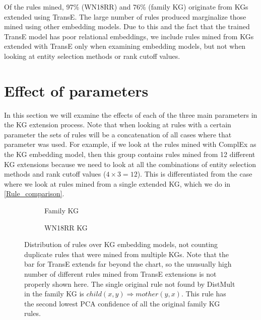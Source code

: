 Of the rules mined, 97\% (WN18RR) and 76\% (family KG) originate from KGs extended using TransE. The large number of rules produced marginalize those mined using other embedding models. Due to this and the fact that the trained TransE model has poor relational embeddings, we include rules mined from KGs extended with TransE only when examining embedding models, but not when looking at entity selection methods or rank cutoff values.






\section{Effect of parameters}
In this section we will examine the effects of each of the three main parameters in the KG extension process. Note that when looking at rules with a certain parameter the sets of rules will be a concatenation of all cases where that parameter was used. For example, if we look at the rules mined with ComplEx as the KG embedding model, then this group contains rules mined from 12 different KG extensions because we need to look at all the combinations of entity selection methods and rank cutoff values ($4\times3=12$). This is differentiated from the case where we look at rules mined from a single extended KG, which we do in \cref{Rule_comparison}.

\begin{figure}[htbp]
\centering
\begin{subfigure}{1\textwidth}
  \centering
  
  \caption{Family KG}
  \label{rule_dist_models_hbar_family}
\end{subfigure}%
\hfill
\begin{subfigure}{1\textwidth}
  \centering
  
  \caption{WN18RR KG}
  \label{rule_dist_models_hbar_wn18rr}
\end{subfigure}
\caption[Rules and their types over KG embedding models]{Distribution of rules over KG embedding models, not counting duplicate rules that were mined from multiple KGs. Note that the bar for TransE extends far beyond the chart, so the unusually high number of different rules mined from TransE extensions is not properly shown here. The single original rule not found by DistMult in the family KG is $child(x, y) \Rightarrow mother(y,x)$. This rule has the second lowest PCA confidence of all the original family KG rules.}
\label{rule_dist_models_hbar}
\end{figure}

